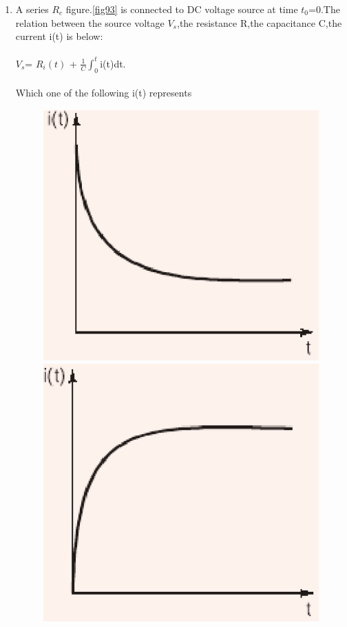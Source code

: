 \documentclass[journal,12pt,twocolumn]{IEEEtran}
\begin{document}
\begin{enumerate}
\item A series $R_{c}$ figure.\ref{fig93} is connected to DC voltage source at time $t_{0}$=0.The relation between the source voltage $V_{s}$,the resistance R,the capacitance C,the current i(t) is below:\\ \\
$V_{s}$= $R_{i}(t)$ + $\frac{1}{C}\int_{0}^{t}$i(t)dt.\\ \\Which one of the following i(t) represents
\begin{figure}[!h]
\begin{center}
\includegraphics[scale=0.4]{./figs/fig93a.eps}
\includegraphics[scale=0.4]{./figs/fig93b.eps}

\end{center}
\end{figure}
\end{enumerate}
\end{document}

